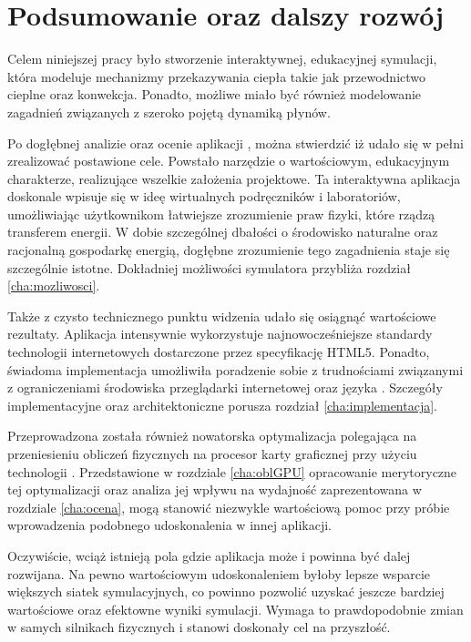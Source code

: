 \chapter{Podsumowanie oraz dalszy rozwój}

Celem niniejszej pracy było stworzenie interaktywnej, edukacyjnej symulacji,
która modeluje mechanizmy przekazywania ciepła takie jak przewodnictwo cieplne
oraz konwekcja. Ponadto, możliwe miało być również modelowanie zagadnień
związanych z szeroko pojętą dynamiką płynów.

Po dogłębnej analizie oraz ocenie aplikacji \en, można stwierdzić iż udało się w
pełni zrealizować postawione cele. Powstało narzędzie o wartościowym,
edukacyjnym charakterze, realizujące wszelkie założenia projektowe. Ta
interaktywna aplikacja doskonale wpisuje się w ideę wirtualnych podręczników i
laboratoriów, umożliwiając użytkownikom łatwiejsze zrozumienie praw fizyki,
które rządzą transferem energii. W dobie szczególnej dbałości o środowisko
naturalne oraz racjonalną gospodarkę energią, dogłębne zrozumienie tego
zagadnienia staje się szczególnie istotne. Dokładniej możliwości symulatora
przybliża rozdział \ref{cha:mozliwosci}.

Także z czysto technicznego punktu widzenia udało się osiągnąć wartościowe
rezultaty. Aplikacja intensywnie wykorzystuje najnowocześniejsze standardy
technologii internetowych dostarczone przez specyfikację HTML5. Ponadto,
świadoma implementacja umożliwiła poradzenie sobie z trudnościami związanymi z
ograniczeniami środowiska przeglądarki internetowej oraz języka \js. Szczegóły
implementacyjne oraz architektoniczne porusza rozdział \ref{cha:implementacja}.

Przeprowadzona została również nowatorska optymalizacja polegająca na
przeniesieniu obliczeń fizycznych na procesor karty graficznej przy użyciu
technologii . Przedstawione w rozdziale \ref{cha:oblGPU} opracowanie
merytoryczne tej optymalizacji oraz analiza jej wpływu na wydajność
zaprezentowana w rozdziale \ref{cha:ocena}, mogą stanowić niezwykle wartościową
pomoc przy próbie wprowadzenia podobnego udoskonalenia w innej aplikacji.

Oczywiście, wciąż istnieją pola gdzie aplikacja może i powinna być dalej
rozwijana. Na pewno wartościowym udoskonaleniem byłoby lepsze wsparcie większych
siatek symulacyjnych, co powinno pozwolić uzyskać jeszcze bardziej wartościowe
oraz efektowne wyniki symulacji. Wymaga to prawdopodobnie zmian w samych
silnikach fizycznych i stanowi doskonały cel na przyszłość.
